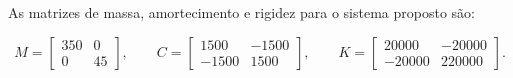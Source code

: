 \documentclass[12pt,a4paper]{article}
\begin{document}

As matrizes de massa, amortecimento e rigidez para o sistema proposto são:

\begin{equation}
    M =
    \begin{bmatrix}
        350 & 0 \\
        0 & 45
    \end{bmatrix}, \qquad
    C =
    \begin{bmatrix}
        1500 & -1500 \\
        -1500 & 1500
    \end{bmatrix}, \qquad
    K =
    \begin{bmatrix}
        20000 & -20000 \\
        -20000 & 220000
    \end{bmatrix}.
    \label{eq:matrizes}
\end{equation}
\end{document}
